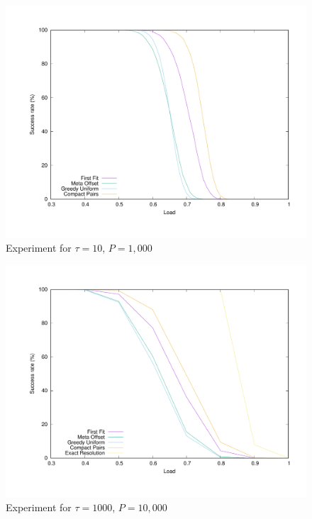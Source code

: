 \documentclass[a4paper,UKenglish,cleveref, autoref, thm-restate]{lipics-v2019}
\begin{document}
\begin{figure}
\begin{center}
\includegraphics[scale=0.3]{100messSmall}
\end{center}
\caption{Experiment for $\tau = 10$, $P=1,000$}
\label{fig:100messSmall}
\end{figure}

\begin{figure}
\begin{center}
\includegraphics[scale=0.3]{10mess}
\end{center}
\caption{Experiment for $\tau = 1000$, $P=10,000$}
\label{fig:10mess}
\end{figure}
\end{document}
